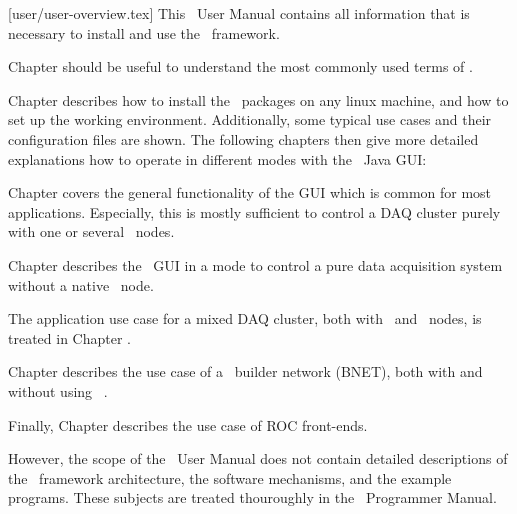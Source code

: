 [user/user-overview.tex]
This \dabc\ User Manual contains all information that is necessary to
install and use the \dabc\ framework.

Chapter  should be useful to understand the
most commonly used terms of \dabc.

Chapter  describes how to install the
\dabc\ packages on any linux machine, and how to set up the working
environment. Additionally, some typical use cases and their configuration
files are shown. 
The following chapters then give more detailed explanations how to operate
in different modes with the \dabc\ Java GUI:

Chapter 
covers the general functionality of the GUI
which is common for most applications. Especially, this 
is mostly sufficient
to control a DAQ cluster purely with one or several \dabc\ nodes.

Chapter  describes the \dabc\ GUI 
in a mode to control a pure \mbs data acquisition system without 
a native \dabc\ node.

The application use case for a mixed DAQ cluster, both with \dabc\ and \mbs\ nodes, is
treated in Chapter .

Chapter  describes the use case of
a \dabc\ builder network (BNET), both with and without using \mbs\ .

Finally, Chapter  describes the use case of
ROC front-ends.

However, the scope of the \dabc\ User Manual does not contain 
detailed descriptions of the \dabc\ framework architecture, 
the software mechanisms, and the example programs. 
These subjects are treated thouroughly
in the \dabc\ Programmer Manual.


